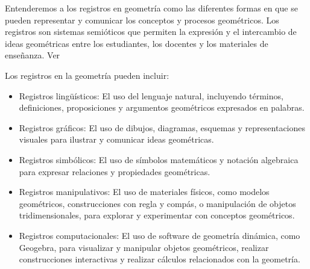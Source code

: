 Entenderemos a los registros en geometría como las diferentes formas en que se pueden representar y comunicar los conceptos y procesos geométricos. Los registros son sistemas semióticos que permiten la expresión y el intercambio de ideas geométricas entre los estudiantes, los docentes y los materiales de enseñanza. Ver \textcite{duval1999semiosis}

Los registros en la geometría pueden incluir:
\begin{itemize}
	\item Registros lingüísticos: El uso del lenguaje natural, incluyendo términos, definiciones, proposiciones y argumentos geométricos expresados en palabras.
	\item Registros gráficos: El uso de dibujos, diagramas, esquemas y representaciones visuales para ilustrar y comunicar ideas geométricas.
	\item Registros simbólicos: El uso de símbolos matemáticos y notación algebraica para expresar relaciones y propiedades geométricas.
	\item Registros manipulativos: El uso de materiales físicos, como modelos geométricos, construcciones con regla y compás, o manipulación de objetos tridimensionales, para explorar y experimentar con conceptos geométricos.
	\item Registros computacionales: El uso de software de geometría dinámica, como Geogebra, para visualizar y manipular objetos geométricos, realizar construcciones interactivas y realizar cálculos relacionados con la geometría.
\end{itemize}

